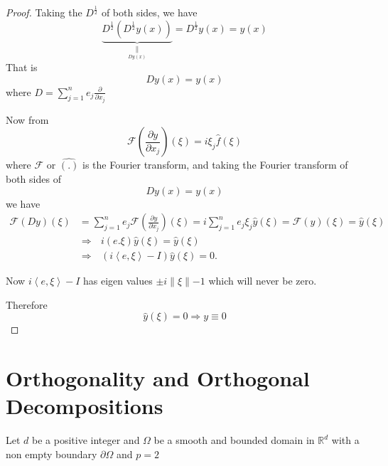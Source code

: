 \documentclass{amsart}%
\providecommand{\U}[1]{\protect\rule{.1in}{.1in}}
\theoremstyle{plain}
\numberwithin{equation}{section}
\begin{document}
\begin{proof}
Taking the $D^{\frac{1}{2}}$ of both sides, we have
\[
\underset{\underset{Dy(x)}{\parallel}}{\underbrace{D^{\frac{1}{2}}\left(
D^{\frac{1}{2}}y(x)\right)  }}=D^{\frac{1}{2}}y(x)=y(x)
\]
That is
\[
Dy(x)=y(x)
\]
where $D=%
{\displaystyle\sum\limits_{j=1}^{n}}
e_{j}\frac{\partial}{\partial x_{j}}$

Now from
\[%
\mathcal{F}%
\left(  \frac{\partial y}{\partial x_{j}}\right)  \left(  \xi\right)
=i\xi_{j}\widehat{f}(\xi)
\]
where $%
\mathcal{F}%
$ or $\widehat{(.)}$ is the Fourier transform, and taking the Fourier
transform of both sides of
\[
Dy(x)=y(x)
\]
we have
\begin{align*}%
\mathcal{F}%
\left(  Dy\right)  \left(  \xi\right)   & =%
{\displaystyle\sum\limits_{j=1}^{n}}
e_{j}%
\mathcal{F}%
\left(  \frac{\partial y}{\partial x_{j}}\right)  \left(  \xi\right)  =i%
{\displaystyle\sum\limits_{j=1}^{n}}
e_{j}\xi_{j}\widehat{y}\left(  \xi\right)  =%
\mathcal{F}%
\left(  y\right)  \left(  \xi\right)  =\widehat{y}(\xi)\\
& \Longrightarrow\text{ \ \ }i\left(  e.\xi\right)  \widehat{y}(\xi
)=\widehat{y}\left(  \xi\right) \\
& \Longrightarrow\text{ \ \ }\left(  i\left\langle e,\xi\right\rangle
-I\right)  \widehat{y}\left(  \xi\right)  =0.
\end{align*}


Now $i\left\langle e,\xi\right\rangle -I$ has eigen values $\pm i\parallel
\xi\parallel-1$ which will never be zero.

Therefore
\[
\widehat{y}\left(  \xi\right)  =0\Longrightarrow y\equiv0
\]

\end{proof}

\section{Orthogonality and Orthogonal Decompositions}

Let $d$ be a positive integer and $\Omega$ be a smooth and bounded domain in $%
\mathbb{R}
^{d}$ with a non empty boundary $\partial\Omega$ and $p=2$
\end{document}
